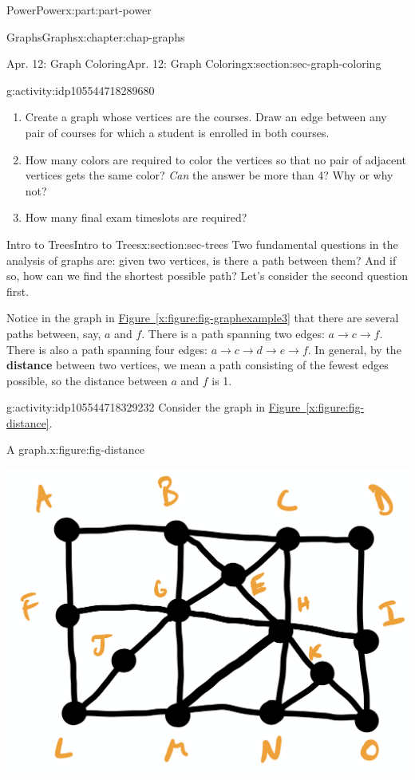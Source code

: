 \documentclass[oneside,10pt,]{book}
\newcommand{\xreffont}{\relax}
\newcommand{\terminology}[1]{\textbf{#1}}
\numberwithin{equation}{section}
\begin{document}
\begin{partptx}{Power}{}{Power}{}{}{x:part:part-power}
\begin{chapterptx}{Graphs}{}{Graphs}{}{}{x:chapter:chap-graphs}
\begin{sectionptx}{Apr. 12: Graph Coloring}{}{Apr. 12: Graph Coloring}{}{}{x:section:sec-graph-coloring}
\begin{activity}{}{g:activity:idp105544718289680}
\begin{enumerate}
\item{}Create a graph whose vertices are the courses. Draw an edge between any pair of courses for which a student is enrolled in both courses.%
\item{}How many colors are required to color the vertices so that no pair of adjacent vertices gets the same color? \emph{Can} the answer be more than 4? Why or why not?%
\item{}How many final exam timeslots are required?%
\end{enumerate}
\end{activity}%
\end{sectionptx}
%
%
\typeout{************************************************}
\typeout{************************************************}
%
\begin{sectionptx}{Intro to Trees}{}{Intro to Trees}{}{}{x:section:sec-trees}
Two fundamental questions in the analysis of graphs are: given two vertices, is there a path between them? And if so, how can we find the shortest possible path? Let's consider the second question first.%
\par
Notice in the graph in \hyperref[x:figure:fig-graphexample3]{Figure~{\xreffont\ref{x:figure:fig-graphexample3}}} that there are several paths between, say, \(a\) and \(f\). There is a path spanning two edges: \(a \to c \to f\). There is also a path spanning four edges: \(a\to c \to d \to e \to f\). In general, by the \terminology{distance} between two vertices, we mean a path consisting of the fewest edges possible, so the distance between \(a\) and \(f\) is 1.%
\begin{activity}{}{g:activity:idp105544718329232}%
Consider the graph in \hyperref[x:figure:fig-distance]{Figure~{\xreffont\ref{x:figure:fig-distance}}}.%
\begin{figureptx}{A graph.}{x:figure:fig-distance}{}%
\begin{image}{0.25}{0.5}{0.25}%
\includegraphics[width=\linewidth]{images/graph04.png}

\end{image}
\end{figureptx}
\end{activity}
\end{sectionptx}
\end{chapterptx}
\end{partptx}
\end{document}
